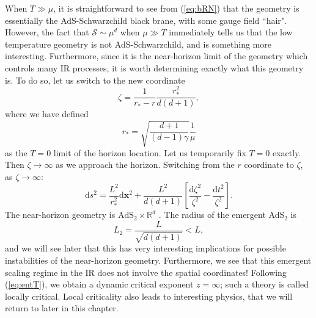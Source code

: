 \documentclass[10pt, oneside]{book}
\begin{document}
\begin{doublespace}
When $T\gg \mu$, it is straightforward to see from (\ref{eq:bRN}) that the geometry is essentially the AdS-Schwarzchild black brane, with some gauge field ``hair".    However,  the fact that $\mathcal{S}\sim \mu^d$ when $\mu \gg T$ immediately tells us that the low temperature geometry is not AdS-Schwarzchild, and is something more interesting.    Furthermore, since it is the near-horizon limit of the geometry which controls many IR processes, it is worth determining exactly what this geometry is.   To do so, let us switch to the new coordinate \begin{equation}
\zeta = \frac{1}{r_*-r} \frac{r_*^2}{d(d+1)} ,
\end{equation} 
where we have defined \begin{equation}
r_* = \sqrt{\frac{d+1}{(d-1)\gamma}} \frac{1}{\mu}
\end{equation}
as the $T=0$ limit of the horizon location.   Let us temporarily fix $T=0$ exactly.   Then $\zeta\rightarrow\infty$ as we approach the horizon.  Switching from the $r$ coordinate to $\zeta$, as $\zeta \rightarrow \infty$: \begin{equation}
\mathrm{d}s^2 = \frac{L^2}{r_*^{2}}\mathrm{d}\mathbf{x}^2 + \frac{L^2}{d(d+1)} \left[\frac{\mathrm{d}\zeta^2}{\zeta^2}  -\frac{\mathrm{d}t^2}{\zeta^2}\right].
\end{equation}
The near-horizon geometry is $\mathrm{AdS}_2 \times \mathbb{R}^{d}$ \cite{Faulkner:2009wj}.   The radius of the emergent AdS$_2$ is \begin{equation}
L_2 = \frac{L}{\sqrt{d(d+1)}} < L,
\end{equation}
and we will see later that this has very interesting implications for possible instabilities of the near-horizon geometry.   Furthermore, we see that this emergent scaling regime in the IR does not involve the spatial coordinates!   Following (\ref{eq:entT}), we obtain a dynamic critical exponent $z=\infty$;  such a theory is called locally critical.    Local criticality also leads to interesting physics, that we will return to later in this chapter.


\end{doublespace}
\end{document}
